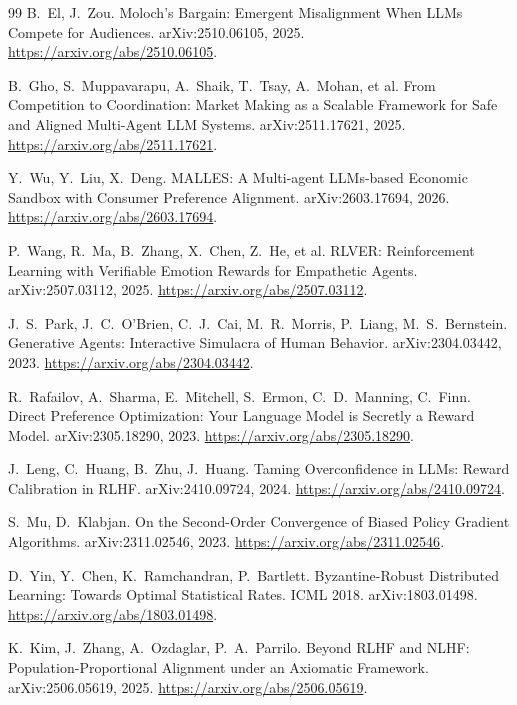 \documentclass[11pt]{article}
\theoremstyle{plain}
\theoremstyle{definition}
\theoremstyle{remark}
\begin{document}
\begin{thebibliography}{99}
B.~El, J.~Zou.
\newblock Moloch's Bargain: Emergent Misalignment When LLMs Compete for Audiences.
\newblock arXiv:2510.06105, 2025. \url{https://arxiv.org/abs/2510.06105}.

B.~Gho, S.~Muppavarapu, A.~Shaik, T.~Tsay, A.~Mohan, et al.
\newblock From Competition to Coordination: Market Making as a Scalable Framework for Safe and
Aligned Multi-Agent LLM Systems.
\newblock arXiv:2511.17621, 2025. \url{https://arxiv.org/abs/2511.17621}.

Y.~Wu, Y.~Liu, X.~Deng.
\newblock MALLES: A Multi-agent LLMs-based Economic Sandbox with Consumer Preference Alignment.
\newblock arXiv:2603.17694, 2026. \url{https://arxiv.org/abs/2603.17694}.

P.~Wang, R.~Ma, B.~Zhang, X.~Chen, Z.~He, et al.
\newblock RLVER: Reinforcement Learning with Verifiable Emotion Rewards for Empathetic Agents.
\newblock arXiv:2507.03112, 2025. \url{https://arxiv.org/abs/2507.03112}.

J.~S.~Park, J.~C.~O'Brien, C.~J.~Cai, M.~R.~Morris, P.~Liang, M.~S.~Bernstein.
\newblock Generative Agents: Interactive Simulacra of Human Behavior.
\newblock arXiv:2304.03442, 2023. \url{https://arxiv.org/abs/2304.03442}.

R.~Rafailov, A.~Sharma, E.~Mitchell, S.~Ermon, C.~D.~Manning, C.~Finn.
\newblock Direct Preference Optimization: Your Language Model is Secretly a Reward Model.
\newblock arXiv:2305.18290, 2023. \url{https://arxiv.org/abs/2305.18290}.

J.~Leng, C.~Huang, B.~Zhu, J.~Huang.
\newblock Taming Overconfidence in LLMs: Reward Calibration in RLHF.
\newblock arXiv:2410.09724, 2024. \url{https://arxiv.org/abs/2410.09724}.

S.~Mu, D.~Klabjan.
\newblock On the Second-Order Convergence of Biased Policy Gradient Algorithms.
\newblock arXiv:2311.02546, 2023. \url{https://arxiv.org/abs/2311.02546}.

D.~Yin, Y.~Chen, K.~Ramchandran, P.~Bartlett.
\newblock Byzantine-Robust Distributed Learning: Towards Optimal Statistical Rates.
\newblock ICML 2018. arXiv:1803.01498. \url{https://arxiv.org/abs/1803.01498}.

K.~Kim, J.~Zhang, A.~Ozdaglar, P.~A.~Parrilo.
\newblock Beyond RLHF and NLHF: Population-Proportional Alignment under an Axiomatic Framework.
\newblock arXiv:2506.05619, 2025. \url{https://arxiv.org/abs/2506.05619}.


\end{thebibliography}
\end{document}
